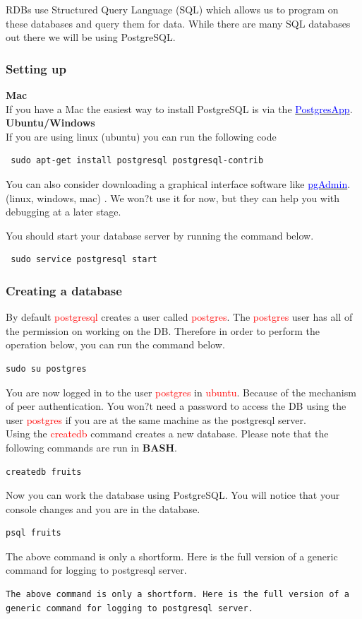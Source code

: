\documentclass[a4paper]{article}
\begin{document}
RDBs use Structured Query Language (SQL) which allows us to program on these databases and query them for data. While there are many SQL databases out there we will be using PostgreSQL.\\
\subsubsection{Setting up}

\textbf{Mac}\\
If you have a Mac the easiest way to install PostgreSQL is via the \href{http://postgresapp.com}{\textcolor{blue}{ PostgresApp}}.
\textbf{Ubuntu/Windows}\\
If you are using linux (ubuntu) you can run the following code
\begin{lstlisting}
 sudo apt-get install postgresql postgresql-contrib
\end{lstlisting}
You can also consider downloading a graphical interface software like \href{https://www.pgadmin.org}{\textcolor{blue}{ pgAdmin}}.
 (linux, windows, mac) . We won?t use it for now, but they can help you with debugging at a later stage.

You should start your database server by running the command below.

\begin{lstlisting}
 sudo service postgresql start
\end{lstlisting}
\subsubsection{Creating a database}
By default \textcolor{red}{postgresql} creates a user called \textcolor{red}{postgres}. The \textcolor{red}{postgres} user has all of the permission on working on the DB. Therefore in order to perform the operation below, you can run the command below.
\begin{lstlisting}
sudo su postgres
\end{lstlisting}
You are now logged in to the user \textcolor{red}{postgres} in \textcolor{red}{ubuntu}. Because of the mechanism of peer authentication. You won?t need a password to access the DB using the user \textcolor{red}{postgres} if you are at the same machine as the postgresql server.\\

Using the \textcolor{red}{createdb} command creates a new database. Please note that the following commands are run in \textbf{BASH}.
\begin{lstlisting}
createdb fruits
\end{lstlisting}
Now you can work the database using PostgreSQL. You will notice that your console changes and you are in the database.
\begin{lstlisting}
psql fruits
\end{lstlisting}
The above command is only a shortform. Here is the full version of a generic command for logging to postgresql server.
\begin{lstlisting}
The above command is only a shortform. Here is the full version of a generic command for logging to postgresql server.
\end{lstlisting}
\end{document}
